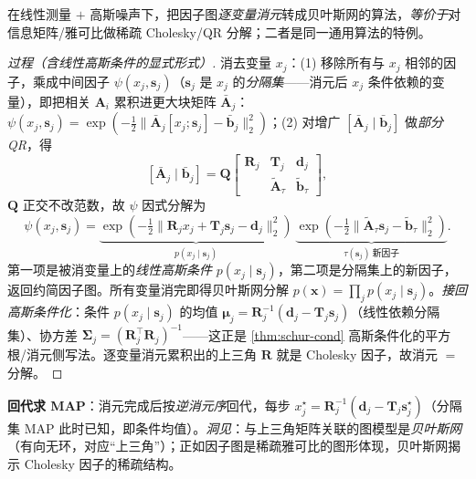 \begin{theorem}[变量消元 $=$ 稀疏矩阵分解]\label{thm:elimination}
在线性测量 $+$ 高斯噪声下，把因子图\emph{逐变量消元}转成贝叶斯网的算法，\emph{等价于}对信息矩阵/雅可比做稀疏 Cholesky/QR 分解；二者是同一通用算法的特例。
\end{theorem}
\begin{proof}[过程（含线性高斯条件的显式形式）]
消去变量 $x_j$：(1) 移除所有与 $x_j$ 相邻的因子，乘成中间因子 $\psi(x_j,\mathbf{s}_j)$（$\mathbf{s}_j$ 是 $x_j$ 的\emph{分隔集}——消元后 $x_j$ 条件依赖的变量），即把相关 $\mathbf{A}_i$ 累积进更大块矩阵 $\bar{\mathbf{A}}_j$：$\psi(x_j,\mathbf{s}_j)=\exp(-\tfrac12\|\bar{\mathbf{A}}_j[x_j;\mathbf{s}_j]-\bar{\mathbf{b}}_j\|_2^2)$；(2) 对增广 $[\bar{\mathbf{A}}_j\mid\bar{\mathbf{b}}_j]$ 做\emph{部分 QR}，得
\[
  [\bar{\mathbf{A}}_j\mid\bar{\mathbf{b}}_j]=\mathbf{Q}\begin{bmatrix}\mathbf{R}_j&\mathbf{T}_j&\mathbf{d}_j\\&\tilde{\mathbf{A}}_\tau&\tilde{\mathbf{b}}_\tau\end{bmatrix},
\]
$\mathbf{Q}$ 正交不改范数，故 $\psi$ 因式分解为
\[
  \psi(x_j,\mathbf{s}_j)=\underbrace{\exp(-\tfrac12\|\mathbf{R}_j x_j+\mathbf{T}_j\mathbf{s}_j-\mathbf{d}_j\|_2^2)}_{p(x_j\mid\mathbf{s}_j)}\ \underbrace{\exp(-\tfrac12\|\tilde{\mathbf{A}}_\tau\mathbf{s}_j-\tilde{\mathbf{b}}_\tau\|_2^2)}_{\tau(\mathbf{s}_j)\ \text{新因子}}.
\]
第一项是被消变量上的\emph{线性高斯条件} $p(x_j\mid\mathbf{s}_j)$，第二项是分隔集上的新因子，返回约简因子图。所有变量消完即得贝叶斯网分解 $p(\mathbf{x})=\prod_j p(x_j\mid\mathbf{s}_j)$。\emph{接回高斯条件化}：条件 $p(x_j\mid\mathbf{s}_j)$ 的均值 $\boldsymbol{\mu}_j=\mathbf{R}_j^{-1}(\mathbf{d}_j-\mathbf{T}_j\mathbf{s}_j)$（线性依赖分隔集）、协方差 $\boldsymbol{\Sigma}_j=(\mathbf{R}_j^\top\mathbf{R}_j)^{-1}$——这正是 \cref{thm:schur-cond} 高斯条件化的平方根/消元侧写法。逐变量消元累积出的上三角 $\mathbf{R}$ 就是 Cholesky 因子，故消元 $=$ 分解。
\end{proof}
\noindent\textbf{回代求 MAP}：消元完成后按\emph{逆消元序}回代，每步 $x_j^\star=\mathbf{R}_j^{-1}(\mathbf{d}_j-\mathbf{T}_j\mathbf{s}_j^\star)$（分隔集 MAP 此时已知，即条件均值）。\emph{洞见}：与上三角矩阵关联的图模型是\emph{贝叶斯网}（有向无环，对应“上三角”）；正如因子图是稀疏雅可比的图形体现，贝叶斯网揭示 Cholesky 因子的稀疏结构。

